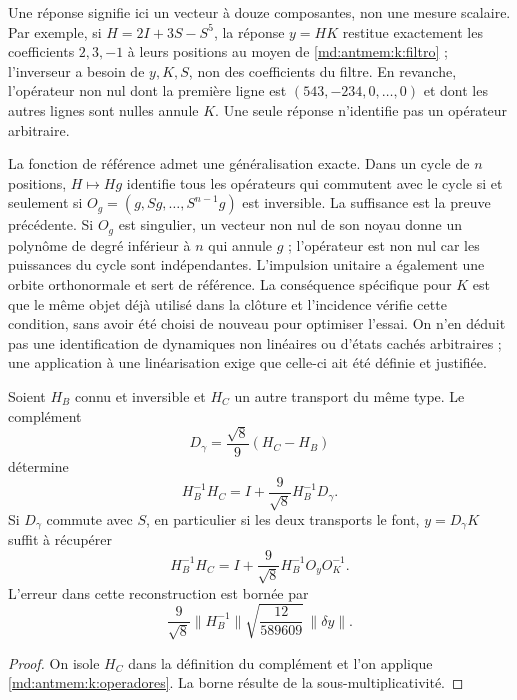 Une réponse signifie ici un vecteur à douze composantes, non une
mesure scalaire. Par exemple, si \(H=2I+3S-S^5\), la réponse
\(y=HK\) restitue exactement les coefficients \(2,3,-1\) à leurs
positions au moyen de \eqref{md:antmem:k:filtro} ; l’inverseur a besoin de \(y,K,S\),
non des coefficients du filtre. En revanche, l’opérateur non nul dont la première
ligne est \((543,-234,0,\ldots,0)\) et dont les autres lignes sont nulles
annule \(K\). Une seule réponse n’identifie pas un opérateur arbitraire.

La fonction de référence admet une généralisation exacte. Dans un cycle de
\(n\) positions, \(H\mapsto Hg\) identifie tous les opérateurs
qui commutent avec le cycle si et seulement si
\(O_g=(g,Sg,\ldots,S^{n-1}g)\) est inversible. La suffisance est la
preuve précédente. Si \(O_g\) est singulier, un vecteur non nul de son noyau
donne un polynôme de degré inférieur à \(n\) qui annule \(g\) ; l’opérateur
est non nul car les puissances du cycle sont indépendantes. L’impulsion
unitaire a également une orbite orthonormale et sert de référence. La
conséquence spécifique pour \(K\) est que le même objet déjà utilisé dans
la clôture et l’incidence vérifie cette condition, sans avoir été choisi de
nouveau pour optimiser l’essai. On n’en déduit pas une identification de
dynamiques non linéaires ou d’états cachés arbitraires ; une application à
une linéarisation exige que celle-ci ait été définie et justifiée.

\begin{corollary}
\label{md:antmem:k:holonomia}
Soient \(H_B\) connu et inversible et \(H_C\) un autre transport du même type. Le complément
\[
 D_\gamma=\frac{\sqrt8}{9}(H_C-H_B)
\]
détermine
\[
 H_B^{-1}H_C=I+\frac9{\sqrt8}H_B^{-1}D_\gamma.
\]
Si \(D_\gamma\) commute avec \(S\), en particulier si les deux
transports le font, \(y=D_\gamma K\) suffit à récupérer
\begin{equation}
 H_B^{-1}H_C
 =I+\frac9{\sqrt8}H_B^{-1}O_yO_K^{-1}.
 \label{md:antmem:k:holonomia-una-respuesta}
\end{equation}
L'erreur dans cette reconstruction est bornée par
\[
 \frac9{\sqrt8}\|H_B^{-1}\|
 \sqrt{\frac{12}{589609}}\,\|\delta y\|.
\]
\end{corollary}
\begin{proof}
On isole \(H_C\) dans la définition du complément et l'on applique \cref{md:antmem:k:operadores}. La borne résulte de la sous-multiplicativité.
\end{proof}

